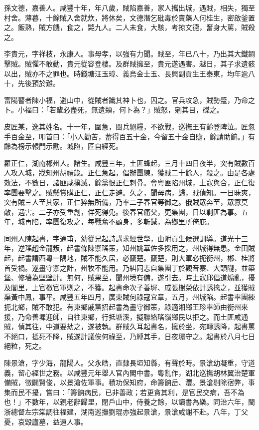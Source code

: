 \begin{pinyinscope}
孫文德，嘉善人。咸豐十年，年八歲，賊陷嘉善，家人攜出城，遇賊，相失，獨至村舍。薄暮，十餘賊入舍就炊，將休矣，文德潛乞砒毒於賣藥人何桂生，密啟釜置之。飯熟，賊方饑，食之，斃九人。二人未食，大駭，考掠文德，奮身大罵，賊殺之。

李貴元，字祥枝，永康人。事母孝，以強有力聞。賊至，年已八十，乃出其大鐵鐧擊賊。賊懼不敢動，貴元從容登樓。及群賊擁至，貴元遂遇害。越日，其子求遺骸以出，賊亦不之罪也。時錢塘汪玉璋、義烏金士玉、長興副貢生王泰東，均年逾八十，先後預於難。

富陽瞽者陳小福，避山中，從賊者識其神卜也，囚之。官兵攻急，賊勢蹙，乃命之卜。小福曰：「若輩必盡死，無遺類，何卜為？」賊怒，剜其目，磔之。

皮匠某，逸其姓名。十一年，圍急，閩兵絕糧，不欲戰，巡撫王有齡登陴泣。匠忽手百金至，叩首曰：「小人勸苦，蓄得百五十金，今留五十金自贍，餘請助餉。」有齡為榜示轅門示勸。城陷，匠自經死。

羅正仁，湖南郴州人。諸生。咸豐三年，土匪蜂起，三月十四日夜半，突有賊數百人攻入城，戕知州胡禮箴。正仁急起，倡辦團練，獲賊二十餘人，殺之。由是各處效法，不數日，諸匪咸撲滅，餘黨恨正仁刺骨。會粵匪陷州城，土寇與合，正仁復率團要擊之。賊懸賞購正仁，正仁走避。久之，聞母病，歸，賊偵知。一日昧爽，突有賊三人至其家，正仁猝無所備，乃率二子春官等御之。俄賊眾奔至，眾寡莫敵，遇害。二子亦受重創，佯死得免。後春官痛父，更集團，日以剿匪為事。五年，城再陷，率團復攻之，每戰奮不顧身，多斬馘，為鄉里所倚庇。

同州人陳起書，字通甫，幼從兄起詩講求經世學，由附貢生候選訓導。道光十三年，逆瑤趙金龍叛，起書條陳禦瑤策，知州姚華佐多採用之，州城得無患。金田賊起，起書謂西粵一隅地，賊不能久居，必竄楚。竄楚，則大軍必扼衡州，郴、桂將首受禍。遂畫守禦之計，州牧不能用。乃糾同志自集團丁於觀音寨、大頭隴，並築堡、修墻為堅壁計。無何，賊果至，聞州境有備，遂引去。時土寇邱倡道煽亂，擾及閭里，上官檄官軍剿之，不獲。起書命次子善墀、戚張樹榮依計誘擒之，並獲賊渠黃中鳳，事平。咸豐五年四月，廣東賊何祿寇宜章，五月，州城陷。起書率團練扼北鄉，賊不敢犯。有東鄉戚黨招起書為畫守御策，祿適湘鄉王珍率師由衡州來援，乃命善墀迎師，自往東鄉，行抵塘溪，擬聯絡瑤嶺鄉民以拒之。而土匪咸通賊，偵其往，中道要劫之，遂被執。群賊久耳起書名，擁於坐，宛轉誘降，起書罵不絕口，抵死不降，賊遂計議俟何祿至，乃縛其手，日夜環守之。起書於八月七日絕粒，死之。

陳景滄，字少海，龍陽人。父永皓，直隸長垣知縣，有聲於時。景滄幼凝重，守道義，留心經世之務。以咸豐元年舉人官內閣中書。粵亂作，湖北巡撫胡林翼治楚軍備賊，徵闢賢俊，以景滄佐軍事。積功保知府，命籌餉岳、灃。景滄剔除宿弊，事集而民不擾，嘗曰：「籌餉病民，已非善政；若更貪其利，是官民交病，吾不為也！」不數年，以親老辭歸里，閉戶山中，侍養之餘，以讀書為樂。同治六年，閩浙總督左宗棠調往福建，湖南巡撫劉琨亦強起景滄，景滄咸謝不赴。八年，丁父憂，哀毀廬墓，益遠人事。


\end{pinyinscope}
